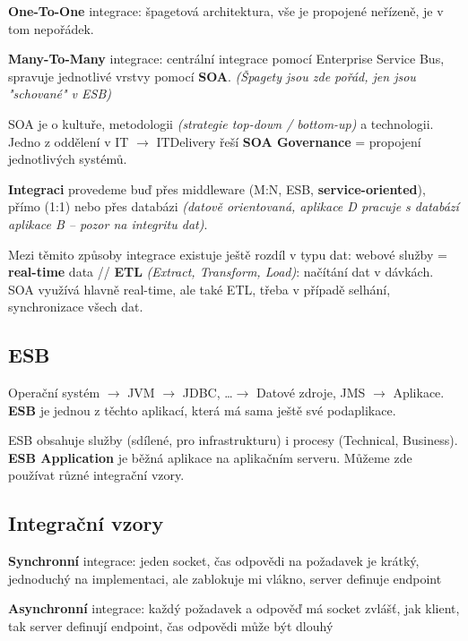 \textbf{One-To-One} integrace: špagetová architektura, vše je propojené neřízeně, je v tom nepořádek.

\vspace{4pt}
\noindent \textbf{Many-To-Many} integrace: centrální integrace pomocí Enterprise Service Bus, spravuje jednotlivé vrstvy pomocí \textbf{SOA}. \textit{(Špagety jsou zde pořád, jen jsou "schované" v ESB)}

\vspace{4pt}
\noindent SOA je o kultuře, metodologii \textit{(strategie top-down / bottom-up)} a technologii. Jedno z oddělení v IT $\to$ ITDelivery řeší \textbf{SOA Governance} = propojení jednotlivých systémů.

\vspace{4pt}
\noindent \textbf{Integraci} provedeme buď přes middleware (M:N, ESB, \textbf{service-oriented}), přímo (1:1) nebo přes databázi \textit{(datově orientovaná, aplikace D pracuje s databází aplikace B -- pozor na integritu dat)}.

\vspace{4pt}
\noindent Mezi těmito způsoby integrace existuje ještě rozdíl v typu dat: webové služby = \textbf{real-time} data // \textbf{ETL} \textit{(Extract, Transform, Load)}: načítání dat v dávkách. SOA využívá hlavně real-time, ale také ETL, třeba v případě selhání, synchronizace všech dat.

\subsection{ESB}

Operační systém $\to$ JVM $\to$ JDBC, \ldots $\to$ Datové zdroje, JMS $\to$ Aplikace. \textbf{ESB} je jednou z těchto aplikací, která má sama ještě své podaplikace.

\vspace{4pt}
\noindent ESB obsahuje služby (sdílené, pro infrastrukturu) i procesy (Technical, Business). \textbf{ESB Application} je běžná aplikace na aplikačním serveru. Můžeme zde používat různé integrační vzory.

\subsection{Integrační vzory}

\textbf{Synchronní} integrace: jeden socket, čas odpovědi na požadavek je krátký, jednoduchý na implementaci, ale zablokuje mi vlákno, server definuje endpoint

\vspace{4pt}
\noindent \textbf{Asynchronní} integrace: každý požadavek a odpověď má socket zvlášť, jak klient, tak server definují endpoint, čas odpovědi může být dlouhý

